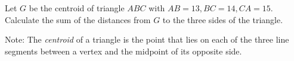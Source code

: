 Let $G$ be the centroid of triangle $ABC$ with $AB=13,BC=14,CA=15$. Calculate the sum of the distances from $G$ to the three sides of the triangle.

Note: The \emph{centroid} of a triangle is the point that lies on each of the three line segments between a vertex and the midpoint of its opposite side.
